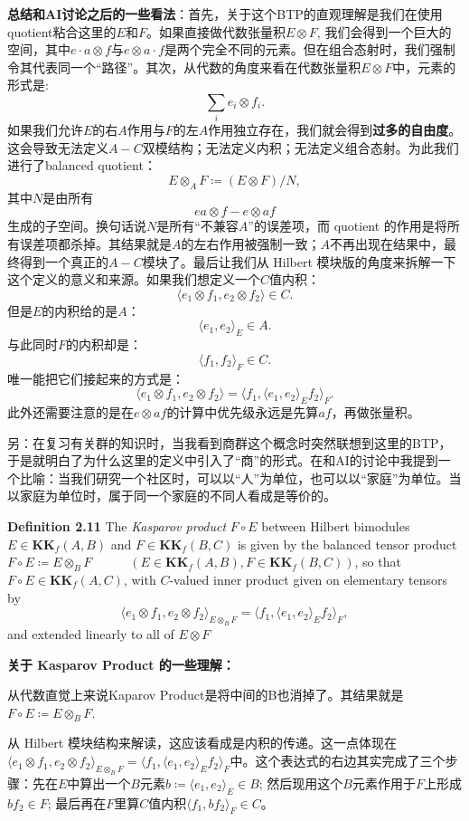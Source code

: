 \textbf{总结和AI讨论之后的一些看法}：首先，关于这个BTP的直观理解是我们在使用quotient粘合这里的$E$和$F$。如果直接做代数张量积$E\otimes F$, 我们会得到一个巨大的空间，其中$e\cdot a\otimes f$与$e\otimes a\cdot f$是两个完全不同的元素。但在组合态射时，我们强制令其代表同一个“路径”。其次，从代数的角度来看在代数张量积$E\otimes F$中，元素的形式是:\[\sum_ie_i\otimes f_i.\]如果我们允许$E$的右$A$作用与$F$的左$A$作用独立存在，我们就会得到\textbf{过多的自由度}。这会导致无法定义$A-C$双模结构；无法定义内积；无法定义组合态射。为此我们进行了balanced quotient： \[E\otimes_AF\coloneq(E\otimes F)/N,\]其中$N$是由所有\[ea\otimes f-e\otimes af\]生成的子空间。换句话说$N$是所有“不兼容$A$”的误差项，而 quotient 的作用是将所有误差项都杀掉。其结果就是$A$的左右作用被强制一致；$A$不再出现在结果中，最终得到一个真正的$A-C$模块了。最后让我们从 Hilbert 模块版的角度来拆解一下这个定义的意义和来源。如果我们想定义一个$C$值内积：\[\langle e_1\otimes f_1,e_2\otimes f_2\rangle\in C.\]但是$E$的内积给的是$A$：\[\langle e_1, e_2\rangle_E\in A.\]与此同时$F$的内积却是：\[\langle f_1,f_2\rangle_F\in C.\]唯一能把它们接起来的方式是：\[\langle e_1\otimes f_1,e_2\otimes f_2\rangle=\langle f_1,\langle e_1, e_2\rangle_Ef_2\rangle_F.\]此外还需要注意的是在$e\otimes af$的计算中优先级永远是先算$af$，再做张量积。

另：在复习有关群的知识时，当我看到商群这个概念时突然联想到这里的BTP，于是就明白了为什么这里的定义中引入了“商”的形式。在和AI的讨论中我提到一个比喻：当我们研究一个社区时，可以以“人”为单位，也可以以“家庭”为单位。当以家庭为单位时，属于同一个家庭的不同人看成是等价的。

\textbf{Definition 2.11} The \textit{Kasparov product} $F\circ E$ between Hilbert bimodules $E\in \textbf{KK}_f(A,B)$ and $F\in \textbf{KK}_f(B,C)$ is given by the balanced tensor product 
$F\circ E \coloneqq E\otimes_B F\quad \quad\quad(E\in\mathbf{KK}_f(A,B), F\in \mathbf{KK}_f(B,C))$,
so that $F\circ E\in \textbf{KK}_f(A,C)$, with $C$-valued inner product given on elementary tensors by 
\begin{equation}
    \langle e_1\otimes f_1, e_2\otimes f_2\rangle_{E\otimes_B F}=\langle f_1,\langle e_1, e_2\rangle_Ef_2\rangle_F,
    \label{eqn: KP}
\end{equation}
and extended linearly to all of $E\otimes F$

\textbf{关于 Kasparov Product 的一些理解：} 

从代数直觉上来说Kaparov Product是将中间的B也消掉了。其结果就是$F\circ E\coloneq E\otimes_B F$. 

从 Hilbert 模块结构来解读，这应该看成是内积的传递。这一点体现在$\langle e_1\otimes f_1, e_2\otimes f_2\rangle_{E\otimes_B F}=\langle f_1,\langle e_1, e_2\rangle_Ef_2\rangle_F$中。这个表达式的右边其实完成了三个步骤：先在$E$中算出一个$B$元素$b\coloneqq \langle e_1,e_2\rangle_E\in B$; 然后现用这个$B$元素作用于$F$上形成$bf_2\in F$; 最后再在$F$里算$C$值内积$\langle f_1, bf_2\rangle_F\in C$。



